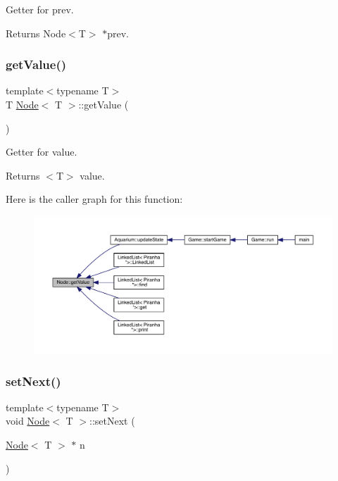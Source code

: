 Getter for prev. 

\begin{DoxyReturn}{Returns}
Node$<$\+T$>$ $\ast$prev. 
\end{DoxyReturn}
\mbox{\label{class_node_a8a9d6500c263a8338c1b763f44f8dadd}} 
\subsubsection{\texorpdfstring{get\+Value()}{getValue()}}
{\footnotesize\ttfamily template$<$typename T$>$ \\
T \mbox{\hyperlink{class_node}{Node}}$<$ T $>$\+::get\+Value (\begin{DoxyParamCaption}{ }\end{DoxyParamCaption})\hspace{0.3cm}{\ttfamily [inline]}}



Getter for value. 

\begin{DoxyReturn}{Returns}
$<$\+T$>$ value. 
\end{DoxyReturn}
Here is the caller graph for this function\+:\nopagebreak
\begin{figure}[H]
\begin{center}
\leavevmode
\includegraphics[width=350pt]{class_node_a8a9d6500c263a8338c1b763f44f8dadd_icgraph}
\end{center}
\end{figure}
\mbox{\label{class_node_a1ef90ff513d88f99b7a7c49d916ac6ea}} 
\subsubsection{\texorpdfstring{set\+Next()}{setNext()}}
{\footnotesize\ttfamily template$<$typename T$>$ \\
void \mbox{\hyperlink{class_node}{Node}}$<$ T $>$\+::set\+Next (\begin{DoxyParamCaption}\item[{\mbox{\hyperlink{class_node}{Node}}$<$ T $>$ $\ast$}]{n }\end{DoxyParamCaption})\hspace{0.3cm}{\ttfamily [inline]}}



